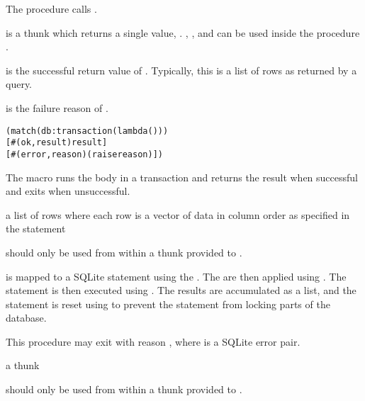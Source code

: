 The  procedure calls .

 is a thunk which returns a single value,
. , , and
 can be used inside the procedure .

 is the successful return value of . Typically,
this is a list of rows as returned by a  query.

 is the failure reason of .

\begin{syntax}
\end{syntax}
\expandsto{} \antipar\begin{alltt}
(match (db:transaction  (lambda ()  \etc))
  [#(ok ,result) result]
  [#(error ,reason) (raise reason)])
\end{alltt}

The  macro runs the body in a transaction and
returns the result when successful and exits when unsuccessful.

\begin{procedure}
\end{procedure}
\returns{}
a list of rows where each row is a vector of data in column order as
specified in the  statement

 should only be used from within a thunk 
provided to .

 is mapped to a SQLite statement using the
. The  are then applied using
. The statement is then executed using
. The results are accumulated as a list, and the
statement is reset using  to prevent the
statement from locking parts of the database.

This procedure may exit with reason , where  is a SQLite error pair.

\begin{procedure}
\end{procedure}
\returns{}
a thunk

 should only be used from within a thunk 
provided to .

